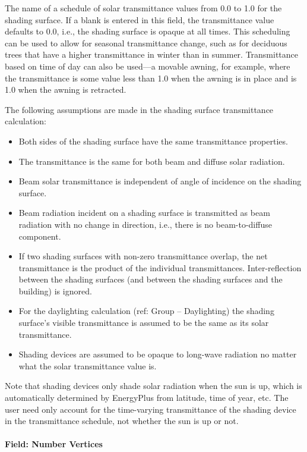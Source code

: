 The name of a schedule of solar transmittance values from 0.0 to 1.0 for the shading surface. If a blank is entered in this field, the transmittance value defaults to 0.0, i.e., the shading surface is opaque at all times. This scheduling can be used to allow for seasonal transmittance change, such as for deciduous trees that have a higher transmittance in winter than in summer. Transmittance based on time of day can also be used---a movable awning, for example, where the transmittance is some value less than 1.0 when the awning is in place and is 1.0 when the awning is retracted.

The following assumptions are made in the shading surface transmittance calculation:

\begin{itemize}
\item
  Both sides of the shading surface have the same transmittance properties.
\item
  The transmittance is the same for both beam and diffuse solar radiation.
\item
  Beam solar transmittance is independent of angle of incidence on the shading surface.
\item
  Beam radiation incident on a shading surface is transmitted as beam radiation with no change in direction, i.e., there is no beam-to-diffuse component.
\item
  If two shading surfaces with non-zero transmittance overlap, the net transmittance is the product of the individual transmittances. Inter-reflection between the shading surfaces (and between the shading surfaces and the building) is ignored.
\item
  For the daylighting calculation (ref: Group -- Daylighting) the shading surface's visible transmittance is assumed to be the same as its solar transmittance.
\item
  Shading devices are assumed to be opaque to long-wave radiation no matter what the solar transmittance value is.
\end{itemize}

Note that shading devices only shade solar radiation when the sun is up, which is automatically determined by EnergyPlus from latitude, time of year, etc. The user need only account for the time-varying transmittance of the shading device in the transmittance schedule, not whether the sun is up or not.

\paragraph{Field: Number Vertices}\label{field-number-vertices-1}

